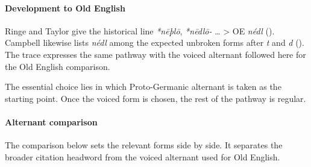 \documentclass[
  british,
  a4paper,
]{article}
\begin{document}
\paragraph{Development to Old
English}\label{development-to-old-english-21}

Ringe and Taylor give the historical line \emph{*nēþlō}, \emph{*nēdlō-}
\ldots{} \textgreater{} OE \emph{nédl}
(). Campbell
likewise lists \emph{nédl} among the expected unbroken forms after
\emph{t} and \emph{d} (). The trace expresses the same pathway with the voiced alternant
followed here for the Old English comparison.

The essential choice lies in which Proto-Germanic alternant is taken as
the starting point. Once the voiced form is chosen, the rest of the
pathway is regular.

\paragraph{Alternant comparison}\label{alternant-comparison}

The comparison below sets the relevant forms side by side. It separates
the broader citation headword from the voiced alternant used for Old
English.
\end{document}
